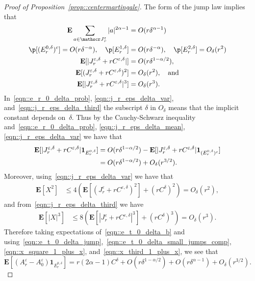 \documentclass[JEP,XML,SOM,Unicode]{cedram}
\let\mathcal\mathscr
\let\epsilon\varepsilon
\theoremstyle{plain}
\numberwithin{theorem}{section}
\theoremstyle{definition}
\newcommand{\CJ}{{\mathcal J}}
\newcommand \E {{\mathbf E}}
\newcommand{\one}{{\mathbf 1}}
\begin{document}
\begin{proof}[Proof of Proposition~\ref{prop::centermartingale}]
The form of the jump law implies that
\begin{align}
\E \sum_{a \in \CJ_r^\epsilon} |a|^{2\alpha-1} &= O( r \delta^{\alpha-1}) \label{eqn::e_t_0_delta_jump}\\
\p[(E_r^{0,\delta})^c] = O(r \delta^{-\alpha}),\quad \p[E_r^{1,\delta}] &= O(r \delta^{-\alpha}),\quad \p[ E_r^{2,\delta}] = O_\delta(r^2) \label{eqn::e_r_0_delta_prob}\\
\E[ |J_r^{\epsilon,\delta} + r C^{\epsilon,\delta}| ] &= O(r \delta^{1-\alpha/2}) \label{eqn::j_r_eps_delta_mean},\\
\E[ (J_r^{\epsilon,\delta} + r C^{\epsilon,\delta})^2] &= O_\delta(r^2), \quad\text{and} \label{eqn::j_r_eps_delta_var}\\
\E[ | J_r^{\epsilon,\delta} + r C^{\epsilon,\delta} |^3] &= O_\delta(r^3). \label{eqn::j_r_eps_delta_third}
\end{align}
In~\eqref{eqn::e_r_0_delta_prob}, \eqref{eqn::j_r_eps_delta_var}, and~\eqref{eqn::j_r_eps_delta_third} the subscript $\delta$ in $O_\delta$ means that the implicit constant depends on~$\delta$. Thus by the Cauchy-Schwarz inequality and~\eqref{eqn::e_r_0_delta_prob}, \eqref{eqn::j_r_eps_delta_mean}, \eqref{eqn::j_r_eps_delta_var} we have that
\begin{align}
\E[| J_r^{\epsilon,\delta} + r C^{\epsilon,\delta} | \one_{E_r^{0,\delta}}]
&= O(r \delta^{1-\alpha/2}) - \E[ | J_r^{\epsilon,\delta} + r C^{\epsilon,\delta}| \one_{(E_r^{0,\delta})^c}] \notag\\
&= O(r \delta^{1-\alpha/2}) + O_\delta(r^{3/2}). \label{eqn::e_t_0_delta_small_jumps_comp}
\end{align}
Moreover, using~\eqref{eqn::j_r_eps_delta_var} we have that
\begin{align}
\E[ X^2]
&\leq 4\left( \E[ (J_r^\epsilon + r C^{\epsilon,\delta})^2] + (r C^\delta)^2 \right)
= O_\delta( r^2), \label{eqn::x_square_1_plus_x}
\end{align}
and from~\eqref{eqn::j_r_eps_delta_third} we have
\begin{align}
\E[|X|^3]
&\leq 8\left( \E[ | J_r^\epsilon + r C^{\epsilon,\delta}|^3] + (r C^\delta)^3 \right)
= O_\delta( r^3). \label{eqn::x_third_1_plus_x}
\end{align}
Therefore taking expectations of~\eqref{eqn::e_t_0_delta_b} and using~\eqref{eqn::e_t_0_delta_jump},~\eqref{eqn::e_t_0_delta_small_jumps_comp}, \eqref{eqn::x_square_1_plus_x}, and~\eqref{eqn::x_third_1_plus_x}, we see that
\begin{equation}
\E[ (A_r^\epsilon - A_0^\epsilon) \one_{E_r^{0,\delta}} ] = r (2\alpha-1) C^\delta + O(r \delta^{1-\alpha/2}) + O(r \delta^{\alpha-1}) + O_\delta(r^{3/2}). \label{eqn::e_t_0_delta}
\end{equation}


\end{proof}
\end{document}
